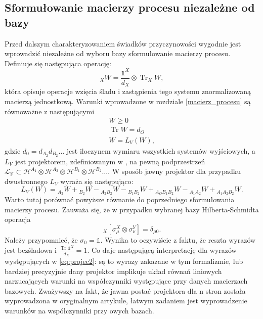 \documentclass[10pt]{article} %
\DeclareMathOperator{\Trs}{Tr}
\newcommand{\Hx}[1]{\mathcal{H}^{#1}}
\newcommand{\I}{\mathbb{1}}
\begin{document}
\subsection{Sformułowanie macierzy procesu niezależne od bazy}
Przed dalszym charakteryzowaniem świadków przyczynowości wygodnie jest wprowadzić niezależne od wyboru bazy sformułowanie macierzy procesu.
Definiuje się następująca operację:
\begin{equation}
{}_X W = \frac{\I^X}{d_X} \otimes \Trs_X W,
\end{equation}
która opisuje operacje wzięcia śladu i zastąpienia tego systemu znormalizowaną macierzą jednostkową.
Warunki wprowadzone w rozdziale \ref{macierz_procesu} są równoważne z następującymi
\begin{gather}
W \geq 0 \\
\Trs W = d_O \\
W = L_V\left(W\right),
\end{gather}
gdzie $d_0 = d_{A_2} d_{B_2} \dots$ jest iloczynem wymiaru wszystkich systemów wyjściowych, a $L_V$ jest projektorem, zdefiniowanym w \cite{causal_witness}, na pewną podprzestrzeń 
$\mathcal{L_V} \subset \Hx{A_1} \otimes \Hx{A_2} \otimes \Hx{B_1} \otimes \Hx{B_2} \dots$.
W sposób jawny projektor dla przypadku dwustronnego $L_V$ wyraża się następująco:
\begin{equation}
\label{eq:projec2}
L_V(W) = {}_{A_2}W + {}_{B_2}W - {}_{A_2B_2}W - {}_{B_1B_2}W + {}_{A_OB_1B_2}W - {}_{A_1A_2}W + {}_{A_1A_2B_2}W.
\end{equation}
Warto tutaj porównać powyższe równanie do poprzedniego sformułowania macierzy procesu. Zauważa się, że w przypadku wybranej bazy Hilberta-Schmidta
operacja
\begin{equation}
{}_X\left[\sigma_\mu^X \otimes \sigma_\nu^Y\right] = \delta_{\mu0}.
\end{equation}
Należy przypomnieć, że $\sigma_0 = \I$.
Wynika to oczywiście z faktu, że reszta wyrazów jest bezśladowa i $\frac{\Trs \I^X}{d_X} = 1$. Co daje następującą interpretację dla wyrazów występujących w \eqref{eq:projec2}: są to wyrazy zakazane w tym formalizmie, lub bardziej precyzyjnie dany projektor implikuje układ równań liniowych narzucających warunki na współczynniki występujące przy danych macierzach bazowych. Zważywszy na fakt, że jawna postać projektora dla n stron została wyprowadzona w oryginalnym artykule, łatwym zadaniem jest wyprowadzenie warunków na współczynniki przy owych bazach. 
\end{document}

